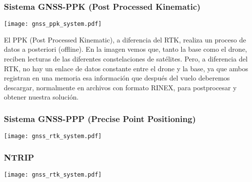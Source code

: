 \begin{frame}
    \frametitle{Sistema GNSS-PPK (Post Processed Kinematic)}
    \begin{center}
        \texttt{[image: gnss\_ppk\_system.pdf]}
    \end{center}

    El PPK (Post Processed Kinematic), a diferencia del RTK, realiza un proceso de datos a posteriori (offline).
    En la imagen vemos que, tanto la base como el drone, reciben lecturas de las diferentes constelaciones de satélites. Pero, a diferencia del RTK, no hay un enlace de datos constante entre el drone y la base, ya que ambos registran en una memoria esa información que después del vuelo deberemos descargar, normalmente en archivos con formato RINEX, para postprocesar y obtener nuestra solución.
    
\end{frame}

\begin{frame}
    \frametitle{Sistema GNSS-PPP (Precise Point Positioning)}
    \begin{center}
        \texttt{[image: gnss\_rtk\_system.pdf]}
    \end{center}

\end{frame}

\begin{frame}
    \frametitle{NTRIP}
    \begin{center}
        \texttt{[image: gnss\_rtk\_system.pdf]}
    \end{center}

\end{frame}